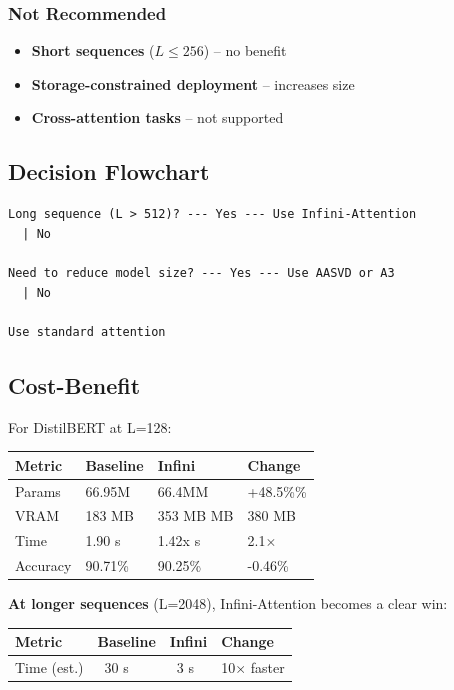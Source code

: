 \subsubsection{Not Recommended}

\begin{itemize}
\item \textbf{Short sequences} ($L \leq 256$) -- no benefit
\item \textbf{Storage-constrained deployment} -- increases size
\item \textbf{Cross-attention tasks} -- not supported

\end{itemize}
\subsection{Decision Flowchart}

\begin{lstlisting}
Long sequence (L > 512)? --- Yes --- Use Infini-Attention
  | No
   
Need to reduce model size? --- Yes --- Use AASVD or A3
  | No
   
Use standard attention
\end{lstlisting}

\subsection{Cost-Benefit}

For DistilBERT at L=128:

\begin{table}[H]
\centering
\small
\begin{tabular}{llll}
\toprule
\textbf{Metric} & \textbf{Baseline} & \textbf{Infini} & \textbf{Change} \\
\midrule
Params & 66.95M & 66.4MM & +48.5\%\% \\
VRAM & 183 MB & 353 MB MB & 380 MB \\
Time & 1.90 s & 1.42x s & 2.1$\times$ \\
Accuracy & 90.71\% & 90.25\% & -0.46\% \\
\bottomrule
\end{tabular}
\end{table}

\textbf{At longer sequences} (L=2048), Infini-Attention becomes a clear win:

\begin{table}[H]
\centering
\small
\begin{tabular}{llll}
\toprule
\textbf{Metric} & \textbf{Baseline} & \textbf{Infini} & \textbf{Change} \\
\midrule
Time (est.) & ~30 s & ~3 s & 10$\times$ faster \\
\bottomrule
\end{tabular}
\end{table}

